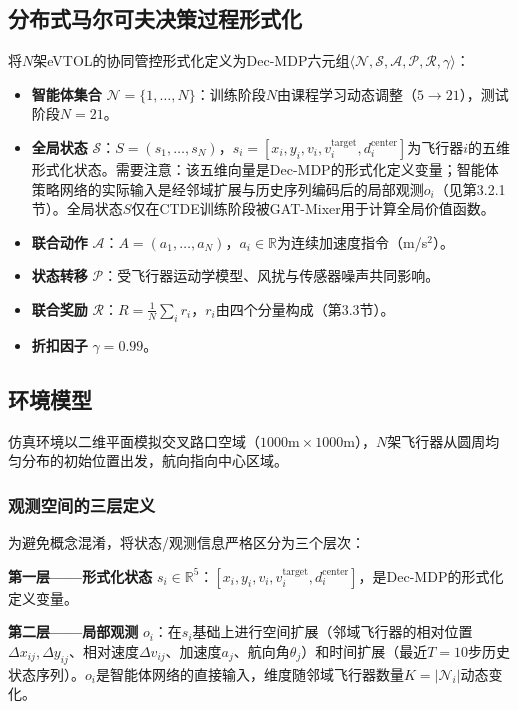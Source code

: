 \documentclass[12pt,a4paper,UTF8]{ctexart}
\begin{document}
\subsection{分布式马尔可夫决策过程形式化}

将$N$架eVTOL的协同管控形式化定义为Dec-MDP六元组$\langle \mathcal{N}, \mathcal{S}, \mathcal{A}, \mathcal{P}, \mathcal{R}, \gamma \rangle$：

\begin{itemize}
    \item \textbf{智能体集合} $\mathcal{N} = \{1, \ldots, N\}$：训练阶段$N$由课程学习动态调整（$5\to21$），测试阶段$N=21$。
    \item \textbf{全局状态} $\mathcal{S}$：$S = (s_1, \ldots, s_N)$，$s_i = [x_i, y_i, v_i, v_i^{\text{target}}, d_i^{\text{center}}]$为飞行器$i$的五维形式化状态。需要注意：该五维向量是Dec-MDP的形式化定义变量；智能体策略网络的实际输入是经邻域扩展与历史序列编码后的局部观测$o_i$（见第3.2.1节）。全局状态$S$仅在CTDE训练阶段被GAT-Mixer用于计算全局价值函数。
    \item \textbf{联合动作} $\mathcal{A}$：$A = (a_1, \ldots, a_N)$，$a_i \in \mathbb{R}$为连续加速度指令（m/s$^2$）。
    \item \textbf{状态转移} $\mathcal{P}$：受飞行器运动学模型、风扰与传感器噪声共同影响。
    \item \textbf{联合奖励} $\mathcal{R}$：$R = \frac{1}{N}\sum_i r_i$，$r_i$由四个分量构成（第3.3节）。
    \item \textbf{折扣因子} $\gamma = 0.99$。
\end{itemize}

\subsection{环境模型}

仿真环境以二维平面模拟交叉路口空域（$1000\text{m} \times 1000\text{m}$），$N$架飞行器从圆周均匀分布的初始位置出发，航向指向中心区域。

\subsubsection{观测空间的三层定义}

为避免概念混淆，将状态/观测信息严格区分为三个层次：

\textbf{第一层——形式化状态} $s_i \in \mathbb{R}^5$：$[x_i, y_i, v_i, v_i^{\text{target}}, d_i^{\text{center}}]$，是Dec-MDP的形式化定义变量。

\textbf{第二层——局部观测} $o_i$：在$s_i$基础上进行空间扩展（邻域飞行器的相对位置$\Delta x_{ij},\Delta y_{ij}$、相对速度$\Delta v_{ij}$、加速度$a_j$、航向角$\theta_j$）和时间扩展（最近$T=10$步历史状态序列）。$o_i$是智能体网络的直接输入，维度随邻域飞行器数量$K = |\mathcal{N}_i|$动态变化。
\end{document}
